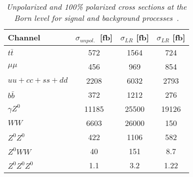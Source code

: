         \begin{table}[H]
        \begin{center}
        \begin{tabular}{l c c c}
        \hline
	Channel & $\sigma_{unpol.}$\ [fb] & $\sigma_{LR}$ [fb] &  $\sigma_{LR}$ [fb] \\
	\hline
	$t\bar{t}$ & 572 & 1564 & 724 \\
	$\mu\mu$ & 456 & 969 & 854 \\
	$uu + cc + ss + dd$ & 2208 & 6032 & 2793 \\
	$b\bar{b}$ & 372 & 1212 & 276 \\
	$\gamma Z^0$ & 11185 & 25500 & 19126 \\
	$WW$ & 6603 & 26000 & 150 \\ 
	$Z^0Z^0$ & 422 & 1106 & 582 \\
	$Z^0WW$ & 40 & 151 & 8.7 \\
	$Z^0 Z^0 Z^0$ & 1.1 & 3.2 & 1.22 \\
        \hline
        \end{tabular}
        \end{center}
        \caption{\sl Unpolarized and 100\% polarized cross sections at the Born level for signal and background processes~\cite{bib:ILCTOP}. }
        \label{table:ttbarsigma}
        \end{table}
